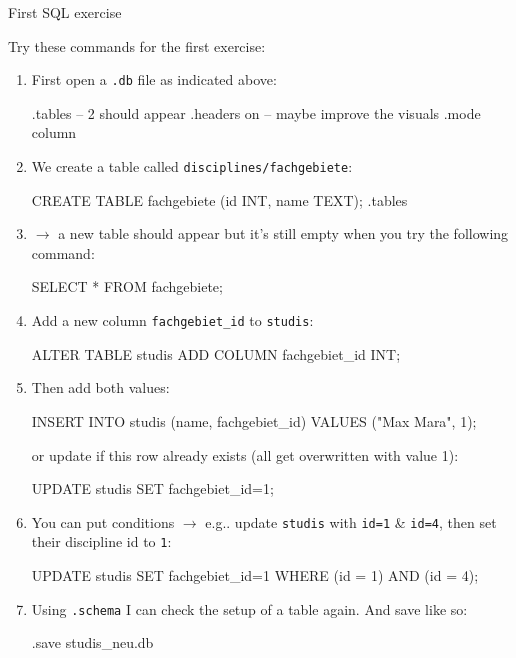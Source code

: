\begin{frame}{First SQL exercise}
\footnotesize
{}


Try these commands for the first exercise:

\begin{enumerate}
    \item First open a \texttt{.db} file as indicated above:
\begin{sqlcode}
.tables -- 2 should appear
.headers on -- maybe improve the visuals
.mode column
\end{sqlcode}

\item We create a table called \texttt{disciplines/fachgebiete}:
\begin{sqlcode}
CREATE TABLE fachgebiete (id INT, name TEXT);
.tables
\end{sqlcode}
\item $\to$ a new table should appear but it's still empty when you try the following command:
\begin{sqlcode}
SELECT * FROM fachgebiete;
\end{sqlcode}
\item  Add a new column \texttt{fachgebiet\_id}  to \texttt{studis}:  
\begin{sqlcode}
ALTER TABLE studis 
ADD COLUMN fachgebiet_id INT;
\end{sqlcode}
\item Then add both values:
\begin{sqlcode}
INSERT INTO studis (name, fachgebiet_id) 
VALUES ("Max Mara", 1);
\end{sqlcode}
or update if this row already exists (all get overwritten with value 1): 
\begin{sqlcode}
UPDATE studis SET fachgebiet_id=1;
\end{sqlcode}

\item You can put conditions $\to$ e.g.. update \texttt{studis} with \texttt{id=1} \& \texttt{id=4}, then set their discipline id to \texttt{1}:
\begin{sqlcode}
UPDATE studis SET fachgebiet_id=1 
WHERE (id = 1) AND (id = 4);
\end{sqlcode}
\item Using \texttt{.schema} I can check the setup of a table again. And save like so:
\begin{sqlcode}
.save studis_neu.db
\end{sqlcode}
\end{enumerate}


\end{frame}

